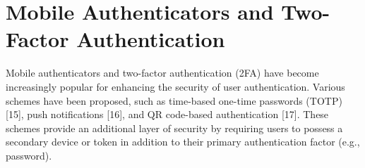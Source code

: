 \section{Mobile Authenticators and Two-Factor Authentication}
Mobile authenticators and two-factor authentication (2FA) have become increasingly popular for enhancing the security of user authentication. Various schemes have been proposed, such as time-based one-time passwords (TOTP) [15], push notifications [16], and QR code-based authentication [17]. These schemes provide an additional layer of security by requiring users to possess a secondary device or token in addition to their primary authentication factor (e.g., password).

